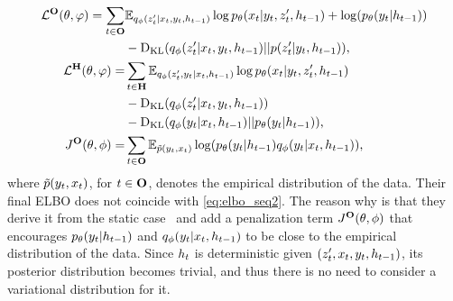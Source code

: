 \begin{align}
    \mathcal{L}^{\mathbf{O}}(\theta,\varphi) = \sum_{t\in \mathbf{O}}
     & {\mathbb{E}}_{q_\phi(z'_t| x_t, y_t, h_{t-1})} 
       \log p_{\theta}(x_t|y_t, z'_t, h_{t-1}) 
       + \log(p_{\theta}(y_t | h_{t-1} ))    \nonumber \\ 
    &  - \mathrm{D}_{\mathrm{KL}} (q_\phi(z'_t|x_t, y_t, h_{t-1})||
    p(z'_t|y_t, h_{t-1} ))  \text{,} \\
    \mathcal{L}^{\mathbf{H}}(\theta,\varphi) =&  \sum_{t\in \mathbf{H}}
     {\mathbb{E}}_{q_\phi(z'_t, y_t| x_t, h_{t-1})} 
       \log p_{\theta}(x_t|y_t, z'_t, h_{t-1})     \nonumber \\ 
    & - \mathrm{D}_{\mathrm{KL}} (q_\phi(z'_t|x_t, y_t, h_{t-1})) \nonumber  \\
    & - \mathrm{D}_{\mathrm{KL}} (q_\phi(y_t| x_t, h_{t-1})|| p_{\theta}(y_t|h_{t-1} )) \text{,}\\
    J^{\mathbf{O}}(\theta,\phi) = & \sum_{t\in \mathbf{O}} 
    {\mathbb{E}}_{\tilde{p}(y_t, x_t)}
    \log(p_{\theta}(y_t | h_{t-1} ) q_\phi(y_t| x_t, h_{t-1})) \text{,}
\end{align}
where $\tilde{p}(y_t, x_t)$, for $t\in \mathbf{O}$, 
denotes the empirical distribution of the data.
Their final ELBO does not coincide with \eqref{eq:elbo_seq2}. 
The reason why is that they derive it 
from the static case~\citep{jang2016categorical} and add 
a penalization term $J^{\mathbf{O}}(\theta,\phi)$  that encourages 
$p_{\theta}(y_t|h_{t-1})$ and $q_\phi(y_t| x_t, h_{t-1})$ 
to be close to the empirical distribution of the data.
Since $h_t$ is deterministic given $(z'_t, x_t, y_t, h_{t-1})$,
its posterior distribution becomes trivial, and thus 
there is no need to consider a variational distribution for it.


